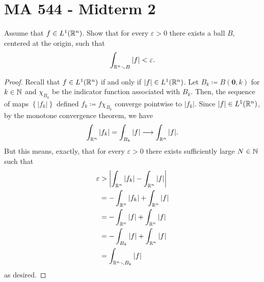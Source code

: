 \section{MA 544 - Midterm 2}
\begin{problem}
Assume that $f\in L^1(\mathbb{R}^n)$. Show that for every $\varepsilon>0$ there
exists a ball $B$, centered at the origin, such that
\[
\int_{\mathbb{R}^n\smallsetminus B}|f|<\varepsilon.
\]
\end{problem}
\begin{proof}
Recall that $f\in L^1(\mathbb{R}^n)$ if and only if $|f|\in
L^1(\mathbb{R}^n)$. Let $B_k\coloneqq B(\mathbf{0},k)$ for $k\in\mathbb{N}$ and
$\chi_{B_k}$ be the indicator function associated with $B_k$. Then, the
sequence of maps $\left\{|f_k|\right\}$ defined $f_k\coloneqq f\chi_{B_k}$
converge pointwise to $|f_k|$. Since $|f|\in L^1(\mathbb{R}^n)$, by the monotone
convergence theorem, we have
\begin{equation}
\label{eq:monotonicity-2-1}
\int_{\mathbb{R}^n} |f_k|=\int_{B_k}|f|\longrightarrow\int_{\mathbb{R}^n}|f|.
\end{equation}
But this means, exactly, that for every $\varepsilon>0$ there exists
sufficiently large $N\in\mathbb{N}$ such that
\begin{equation}
  \label{eq:desired-inequality-2-1}
\begin{aligned}
\varepsilon&>\left|\int_{\mathbb{R}^n}|f_k|-\int_{\mathbb{R}^n}|f|\right|\\
&=-\int_{\mathbb{R}^n}|f_k|+\int_{\mathbb{R}^n}|f|\\
&=-\int_{\mathbb{R}^n}|f|+\int_{\mathbb{R}^n}|f|\\
&=-\int_{B_k}|f|+\int_{\mathbb{R}^n}|f|\\
&=\int_{\mathbb{R}^n\smallsetminus B_k}|f|
\end{aligned}
\end{equation}
as desired.
\end{proof}

